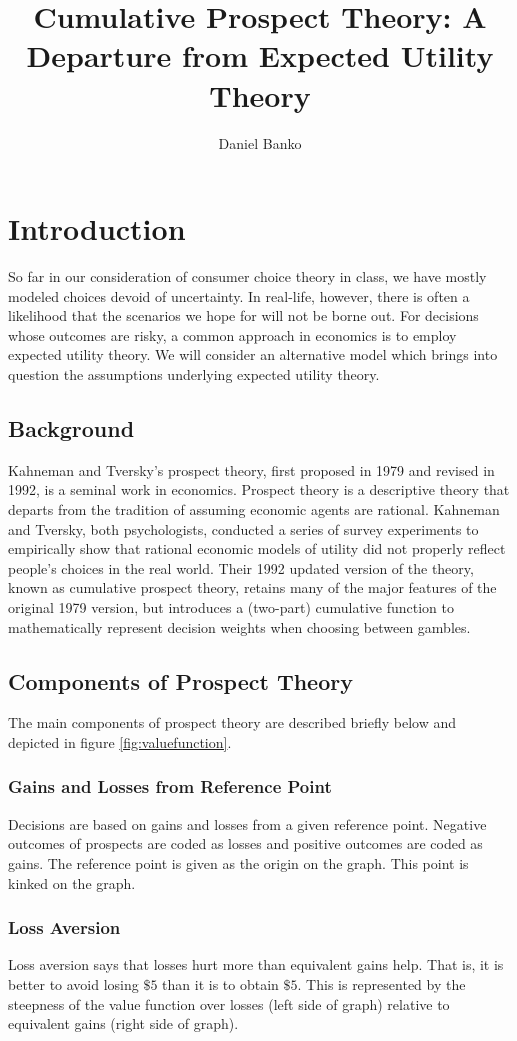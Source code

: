 \documentclass[a4paper,12pt]{article}
\title{Cumulative Prospect Theory: A Departure from Expected Utility Theory}
\author{Daniel Banko}
\numberwithin{equation}{section}
\theoremstyle{definition}
\begin{document}
\maketitle

\section{Introduction}
So far in our consideration of consumer choice theory in class, we have mostly modeled choices devoid of uncertainty. In real-life, however, there is often a likelihood that the scenarios we hope for will not be borne out. For decisions whose outcomes are risky, a common approach in economics is to employ expected utility theory. We will consider an alternative model which brings into question the assumptions underlying expected utility theory.
\subsection{Background}
\indent Kahneman and Tversky's prospect theory, first proposed in 1979 and revised in 1992, is a seminal work in economics. Prospect theory is a descriptive theory that departs from the tradition of assuming economic agents are rational. Kahneman and Tversky, both psychologists, conducted a series of survey experiments to empirically show that rational economic models of utility did not properly reflect people's  choices in the real world. Their 1992 updated version of the theory, known as cumulative prospect theory, retains many of the major features of the original 1979 version, but introduces a (two-part) cumulative function to mathematically represent decision weights when choosing between gambles.

\subsection{Components of Prospect Theory}
The main components of prospect theory are described briefly below and depicted in figure \ref{fig:valuefunction}.
\subsubsection{Gains and Losses from Reference Point}
	Decisions are based on gains and losses from a given reference point. Negative outcomes of prospects are coded as losses and positive outcomes are coded as gains. The reference point is given as the origin on the graph. This point is kinked on the graph.
\subsubsection{Loss Aversion}
	Loss aversion says that losses hurt more than equivalent gains help. That is, it is better to avoid losing $\$5$ than it is to obtain $\$5$. This is represented by the steepness of the value function over losses (left side of graph) relative to equivalent gains (right side of graph).
\end{document}
